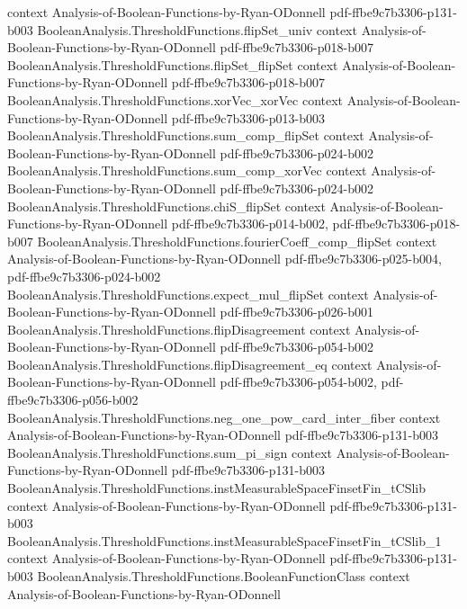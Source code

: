 \begin{theorem}
  {context}
  {Analysis-of-Boolean-Functions-by-Ryan-ODonnell}
  {pdf-ffbe9c7b3306-p131-b003}
\proofstep
  {BooleanAnalysis.ThresholdFunctions.flipSet_univ}
  {context}
  {Analysis-of-Boolean-Functions-by-Ryan-ODonnell}
  {pdf-ffbe9c7b3306-p018-b007}
\proofstep
  {BooleanAnalysis.ThresholdFunctions.flipSet_flipSet}
  {context}
  {Analysis-of-Boolean-Functions-by-Ryan-ODonnell}
  {pdf-ffbe9c7b3306-p018-b007}
\proofstep
  {BooleanAnalysis.ThresholdFunctions.xorVec_xorVec}
  {context}
  {Analysis-of-Boolean-Functions-by-Ryan-ODonnell}
  {pdf-ffbe9c7b3306-p013-b003}
\proofstep
  {BooleanAnalysis.ThresholdFunctions.sum_comp_flipSet}
  {context}
  {Analysis-of-Boolean-Functions-by-Ryan-ODonnell}
  {pdf-ffbe9c7b3306-p024-b002}
\proofstep
  {BooleanAnalysis.ThresholdFunctions.sum_comp_xorVec}
  {context}
  {Analysis-of-Boolean-Functions-by-Ryan-ODonnell}
  {pdf-ffbe9c7b3306-p024-b002}
\proofstep
  {BooleanAnalysis.ThresholdFunctions.chiS_flipSet}
  {context}
  {Analysis-of-Boolean-Functions-by-Ryan-ODonnell}
  {pdf-ffbe9c7b3306-p014-b002,
    pdf-ffbe9c7b3306-p018-b007}
\proofstep
  {BooleanAnalysis.ThresholdFunctions.fourierCoeff_comp_flipSet}
  {context}
  {Analysis-of-Boolean-Functions-by-Ryan-ODonnell}
  {pdf-ffbe9c7b3306-p025-b004,
    pdf-ffbe9c7b3306-p024-b002}
\proofstep
  {BooleanAnalysis.ThresholdFunctions.expect_mul_flipSet}
  {context}
  {Analysis-of-Boolean-Functions-by-Ryan-ODonnell}
  {pdf-ffbe9c7b3306-p026-b001}
\proofstep
  {BooleanAnalysis.ThresholdFunctions.flipDisagreement}
  {context}
  {Analysis-of-Boolean-Functions-by-Ryan-ODonnell}
  {pdf-ffbe9c7b3306-p054-b002}
\proofstep
  {BooleanAnalysis.ThresholdFunctions.flipDisagreement_eq}
  {context}
  {Analysis-of-Boolean-Functions-by-Ryan-ODonnell}
  {pdf-ffbe9c7b3306-p054-b002,
    pdf-ffbe9c7b3306-p056-b002}
\proofstep
  {BooleanAnalysis.ThresholdFunctions.neg_one_pow_card_inter_fiber}
  {context}
  {Analysis-of-Boolean-Functions-by-Ryan-ODonnell}
  {pdf-ffbe9c7b3306-p131-b003}
\proofstep
  {BooleanAnalysis.ThresholdFunctions.sum_pi_sign}
  {context}
  {Analysis-of-Boolean-Functions-by-Ryan-ODonnell}
  {pdf-ffbe9c7b3306-p131-b003}
\proofstep
  {BooleanAnalysis.ThresholdFunctions.instMeasurableSpaceFinsetFin_tCSlib}
  {context}
  {Analysis-of-Boolean-Functions-by-Ryan-ODonnell}
  {pdf-ffbe9c7b3306-p131-b003}
\proofstep
  {BooleanAnalysis.ThresholdFunctions.instMeasurableSpaceFinsetFin_tCSlib_1}
  {context}
  {Analysis-of-Boolean-Functions-by-Ryan-ODonnell}
  {pdf-ffbe9c7b3306-p131-b003}
\proofstep
  {BooleanAnalysis.ThresholdFunctions.BooleanFunctionClass}
  {context}
  {Analysis-of-Boolean-Functions-by-Ryan-ODonnell}

\end{theorem}
